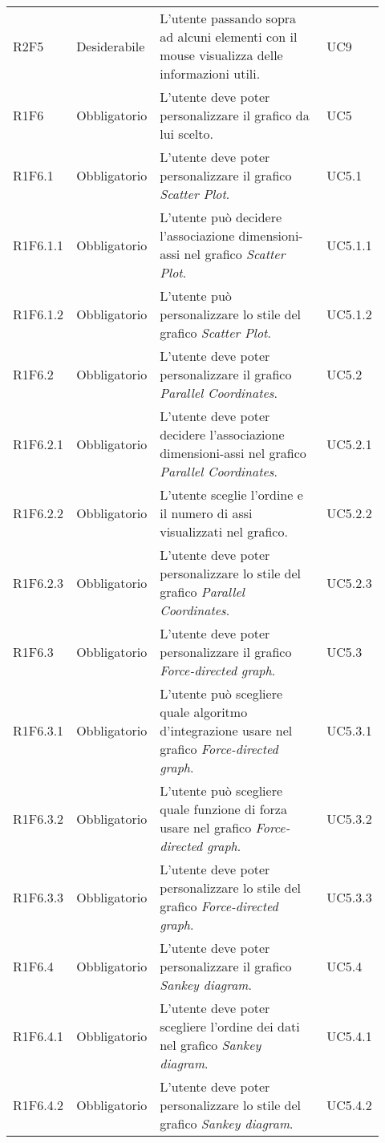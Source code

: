 {\begin{longtable}{p{0.12\linewidth}p{0.15\linewidth}p{0.50\linewidth}p{0.15\linewidth}}
    \rowcolor[RGB]{216, 235, 171}
    R2F5 & Desiderabile & L'utente passando sopra ad alcuni elementi con il mouse visualizza delle informazioni utili. & UC9\\
    
    \rowcolor[RGB]{233, 245, 206}
    R1F6 & Obbligatorio & L'utente deve poter personalizzare il grafico da lui scelto. & UC5\\
    \rowcolor[RGB]{216, 235, 171}
    R1F6.1 & Obbligatorio & L'utente deve poter personalizzare il grafico \textit{Scatter Plot}. & UC5.1\\
    \rowcolor[RGB]{233, 245, 206}
    R1F6.1.1 & Obbligatorio & L'utente può decidere l'associazione dimensioni-assi nel grafico \textit{Scatter Plot}. & UC5.1.1\\
    \rowcolor[RGB]{216, 235, 171}
    R1F6.1.2 & Obbligatorio & L'utente può personalizzare lo stile del grafico \textit{Scatter Plot}. & UC5.1.2\\
    \rowcolor[RGB]{233, 245, 206}
    R1F6.2 & Obbligatorio & L'utente deve poter personalizzare il grafico \textit{Parallel Coordinates}. & UC5.2\\
    \rowcolor[RGB]{216, 235, 171}
    R1F6.2.1 & Obbligatorio & L'utente deve poter decidere l'associazione dimensioni-assi nel grafico \textit{Parallel Coordinates}. & UC5.2.1\\
    \rowcolor[RGB]{233, 245, 206}
    R1F6.2.2 & Obbligatorio & L'utente sceglie l'ordine e il numero di assi visualizzati nel grafico. & UC5.2.2\\
    \rowcolor[RGB]{216, 235, 171}
    R1F6.2.3 & Obbligatorio & L'utente deve poter personalizzare lo stile del grafico \textit{Parallel Coordinates}. & UC5.2.3\\
    \rowcolor[RGB]{233, 245, 206}
    R1F6.3 & Obbligatorio & L'utente deve poter personalizzare il grafico \textit{Force-directed graph}. & UC5.3\\
    \rowcolor[RGB]{216, 235, 171}
    R1F6.3.1 & Obbligatorio & L'utente può scegliere quale algoritmo d'integrazione usare nel grafico \textit{Force-directed graph}. & UC5.3.1\\
    \rowcolor[RGB]{233, 245, 206}
    R1F6.3.2 & Obbligatorio & L'utente può scegliere quale funzione di forza usare nel grafico \textit{Force-directed graph}. & UC5.3.2\\
    \rowcolor[RGB]{216, 235, 171}
    R1F6.3.3 & Obbligatorio & L'utente deve poter personalizzare lo stile del grafico \textit{Force-directed graph}. & UC5.3.3\\
    \rowcolor[RGB]{233, 245, 206}
    R1F6.4 & Obbligatorio & L'utente deve poter personalizzare il grafico \textit{Sankey diagram}. & UC5.4\\
    \rowcolor[RGB]{216, 235, 171}
    R1F6.4.1 & Obbligatorio & L'utente deve poter scegliere l'ordine dei dati nel grafico \textit{Sankey diagram}. & UC5.4.1\\
    \rowcolor[RGB]{233, 245, 206}
    R1F6.4.2 & Obbligatorio & L'utente deve poter personalizzare lo stile del grafico \textit{Sankey diagram}. & UC5.4.2\\


\end{longtable}}
